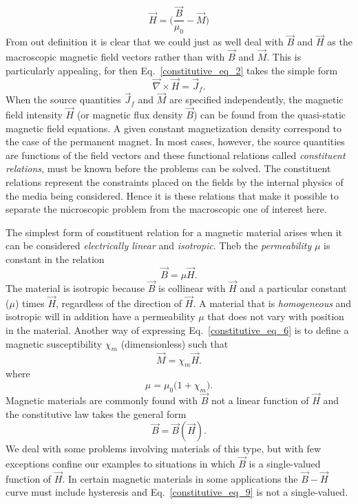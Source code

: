 \documentclass[12pt,a4paper,oneside]{book}
\begin{document}
\begin{onehalfspace}
\begin{equation}\label{constitutive_eq_4}
	\vec{H}=\Big(\frac{\vec{B}}{\mu_0}-\vec{M}\Big)
\end{equation}
From out definition it is clear that we could just as well deal with $\vec{B}$ and $\vec{H}$ as the macroscopic magnetic field vectors rather than with $\vec{B}$ and $\vec{M}$. This is particularly appealing, for then Eq.~\eqref{constitutive_eq_2} takes the simple form
\begin{equation}\label{constitutive_eq_5}
	\vec{\nabla}\times\vec{H}=\vec{J}_f.
\end{equation}
When the source quantities $\vec{J}_f$ and $\vec{M}$ are specified independently, the magnetic field intensity $\vec{H}$ (or magnetic flux density $\vec{B}$) can be found from the quasi-static magnetic field equations. A given constant magnetization density correspond to the case of the permanent magnet. In most cases, however, the source quantities are functions of the field vectors and these functional relations called \textit{constituent relations}, must be known before the problems can be solved. The constituent relations represent the constraints placed on the fields by the internal physics of the media being considered.  Hence it is these relations that make it possible to separate the microscopic problem from the macroscopic one of interest here. 

The simplest form of constituent relation for a magnetic material arises when it can be considered \textit{electrically linear} and \textit{isotropic}. Theb the \textit{permeability} $\mu$ is constant in the relation
\begin{equation}\label{constitutive_eq_6}
	\vec{B}=\mu \vec{H}.
\end{equation}
The material is isotropic because $\vec{B}$ is collinear with $\vec{H}$ and a particular constant ($\mu$) times $\vec{H}$, regardless of the direction of $\vec{H}$. A material that is \textit{homogeneous} and isotropic will in addition have a permeability $\mu$ that does not vary with position in the material. Another way of expressing Eq.~\eqref{constitutive_eq_6} is to define a magnetic susceptibility $\chi_m$ (dimensionless) such that
\begin{equation}\label{constitutive_eq_7}
	\vec{M}=\chi_m\vec{H}.
\end{equation}
where 
\begin{equation}\label{constitutive_eq_8}
	\mu = \mu_0\Big(1+\chi_m\Big).
\end{equation}
Magnetic materials are commonly found with $\vec{B}$ not a linear function of $\vec{H}$ and the constitutive law takes the general form
\begin{equation}\label{constitutive_eq_9}
	\vec{B}=\vec{B}(\vec{H}).
\end{equation}
We deal with some problems involving materials of this type, but with few exceptions confine our examples to situations in which $\vec{B}$ is a single-valued function of $\vec{H}$. In certain magnetic materials in some applications the $\vec{B}-\vec{H}$ curve must include hysteresis and Eq.~\eqref{constitutive_eq_9} is not a single-valued.


\end{onehalfspace}
\end{document}

